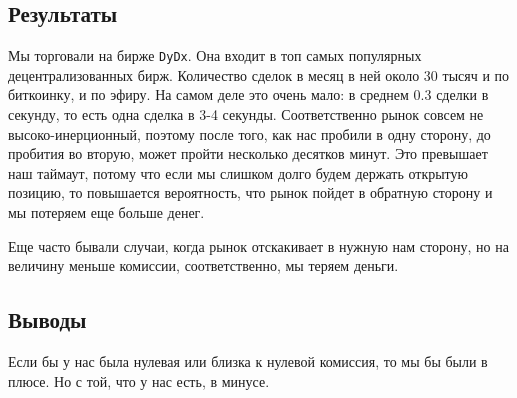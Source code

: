 \subsection{Результаты}
Мы торговали на бирже \texttt{DyDx}. Она входит в топ самых популярных децентрализованных бирж. Количество сделок в месяц в ней около 30 тысяч и по биткоинку, и по эфиру. На самом деле это очень мало: в среднем $0.3$ сделки в секунду, то есть одна сделка в 3-4 секунды. Соответственно рынок совсем не высоко-инерционный, поэтому после того, как нас пробили в одну сторону, до пробития во вторую, может пройти несколько десятков минут. Это превышает наш таймаут, потому что если мы слишком долго будем держать открытую позицию, то повышается вероятность, что рынок пойдет в обратную сторону и мы потеряем еще больше денег.

Еще часто бывали случаи, когда рынок отскакивает в нужную нам сторону, но на величину меньше комиссии, соответственно, мы теряем деньги.

\subsection{Выводы}

Если бы у нас была нулевая или близка к нулевой комиссия, то мы бы были в плюсе. Но с той, что у нас есть, в минусе.